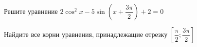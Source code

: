 \begin{ex}
	\begin{condition}
		\begin{enumcols}[label=\asbuk*)]
			\item Решите уравнение \( 2\cos^2 x -5\sin {\left(x+\dfrac{3\pi}{2}\right)} + 2 = 0 \)
			\item Найдите все корни уравнения, принадлежащие отрезку \( \left[\dfrac{\pi}{2};\dfrac{3\pi}{2}\right] \)
		\end{enumcols}
	\end{condition}
\end{ex}